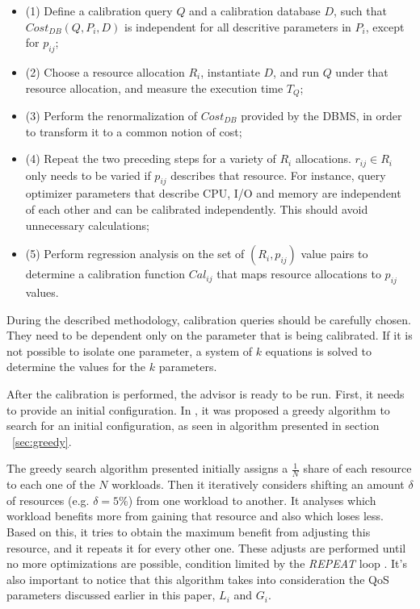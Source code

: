 \begin{itemize}
 \item (1) Define a calibration query $Q$ and a calibration database $D$, such that $Cost_{DB}(Q,P_{i},D)$ is independent for all descritive parameters in $P_{i}$, except for $p_{ij}$; \\
  \item (2) Choose a resource allocation $R_{i}$, instantiate $D$, and run $Q$ under that resource allocation, and measure the execution time $T_{Q}$; \\
  \item (3) Perform the renormalization of $Cost_{DB}$ provided by the DBMS, in order to transform it to a common notion of cost; \\
  \item (4) Repeat the two preceding steps for a variety of $R_{i}$ allocations. $r_{ij} \in R_{i}$ only needs to be varied if $p_{ij}$ describes that resource. For instance, query optimizer parameters that describe CPU, I/O and memory are independent of each other and can be calibrated independently. This should avoid unnecessary calculations; \\
  \item (5) Perform regression analysis on the set of $(R_{i},p_{ij})$ value pairs to determine a calibration function $Cal_{ij}$ that maps resource allocations to $p_{ij}$ values. \\
\end{itemize}

During the described methodology, calibration queries should be carefully chosen. They need to be dependent only on the parameter that is being calibrated. If it is not possible to isolate one parameter, a system of $k$ equations is solved to determine the values for the $k$ parameters.

After the calibration is performed, the advisor is ready to be run. First, it needs to provide an initial configuration. In \cite{Soror:2008:AVM:1376616.1376711}, it was proposed a greedy algorithm to search for an initial configuration, as seen in algorithm presented in section ~\ref{sec:greedy}.


The greedy search algorithm presented initially assigns a $\frac{1}{N}$ share of each resource to each one of the $N$ workloads. Then it iteratively considers shifting an amount $\delta$ of resources (e.g. $\delta = 5\%$) from one workload to another. It analyses which workload benefits more from gaining that resource and also which loses less. Based on this, it tries to obtain the maximum benefit from adjusting this resource, and it repeats it for every other one. These adjusts are performed until no more optimizations are possible, condition limited by the \textit{REPEAT} loop . It's also important to notice that this algorithm takes into consideration the QoS parameters discussed earlier in this paper, $L_{i}$ and $G_{i}$.

